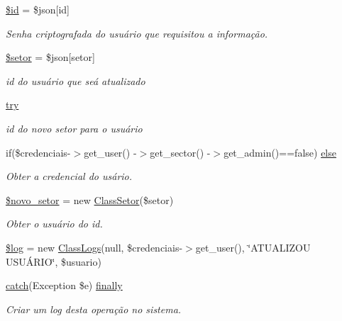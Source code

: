 \begin{DoxyCompactItemize}
\hyperlink{usuarios_2update_8php_ae97941710d863131c700f069b109991e}{\$id} = \$json\mbox{[}\textquotesingle{}id\textquotesingle{}\mbox{]}
\begin{DoxyCompactList}\small\item\em Senha criptografada do usuário que requisitou a informação. \end{DoxyCompactList}\item 
\hyperlink{usuarios_2update_8php_a87435a25b7cae617cf284c729b6e835c}{\$setor} = \$json\mbox{[}\textquotesingle{}setor\textquotesingle{}\mbox{]}
\begin{DoxyCompactList}\small\item\em id do usuário que seá atualizado \end{DoxyCompactList}\item 
\hyperlink{usuarios_2update_8php_abe4cc9788f52e49485473dc699537388}{try}
\begin{DoxyCompactList}\small\item\em id do novo setor para o usuário \end{DoxyCompactList}\item 
if(\$credenciais-\/$>$get\+\_\+user() -\/$>$get\+\_\+sector() -\/$>$get\+\_\+admin()==false) \hyperlink{usuarios_2update_8php_a8f5108ee2efdbfcd6f3d53b8abcb6c09}{else}
\begin{DoxyCompactList}\small\item\em Obter a credencial do usário. \end{DoxyCompactList}\item 
\hyperlink{usuarios_2update_8php_a0a11223e6e2db053ff44173de3a72d6e}{\$novo\+\_\+setor} = new \hyperlink{class_class_setor}{Class\+Setor}(\$setor)
\begin{DoxyCompactList}\small\item\em Obter o usuário do id. \end{DoxyCompactList}\item 
\hyperlink{usuarios_2update_8php_a9a2cf15a653aee8be437f7ae474cd494}{\$log} = new \hyperlink{class_class_logs}{Class\+Logs}(null, \$credenciais-\/$>$get\+\_\+user(), \char`\"{}A\+T\+U\+A\+L\+I\+Z\+OU U\+S\+UÁ\+R\+IO\char`\"{}, \$usuario)
\item 
\hyperlink{imprimir_2ficha_2index_8php_a8104793004944f01dd070fc8b1ade3c4}{catch}(Exception \$e) \hyperlink{usuarios_2update_8php_a1eb47d68a4a4f73debf91b15e179d813}{finally}
\begin{DoxyCompactList}\small\item\em Criar um log desta operação no sistema. \end{DoxyCompactList}\end{DoxyCompactItemize}


